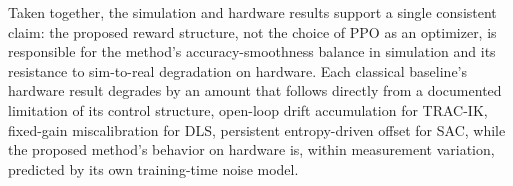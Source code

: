 \documentclass[preprint,12pt]{elsarticle}
\begin{document}
Taken together, the simulation and hardware results support a single
consistent claim: the proposed reward structure, not the choice of PPO
as an optimizer, is responsible for the method's accuracy-smoothness
balance in simulation and its resistance to sim-to-real degradation on
hardware. Each classical baseline's hardware result degrades by an
amount that follows directly from a documented limitation of its control
structure, open-loop drift accumulation for TRAC-IK, fixed-gain
miscalibration for DLS, persistent entropy-driven offset for SAC, while
the proposed method's behavior on hardware is, within measurement
variation, predicted by its own training-time noise model.


\end{document}
